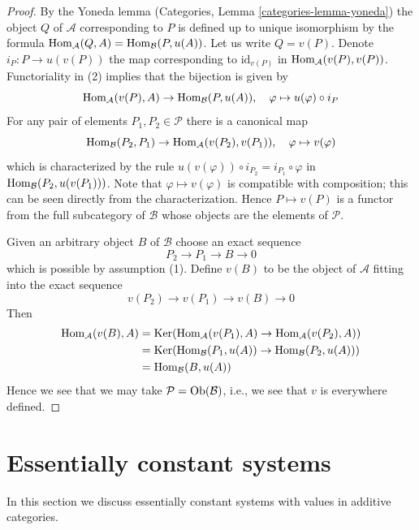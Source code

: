 \begin{proof}
By the Yoneda lemma (Categories, Lemma \ref{categories-lemma-yoneda})
the object $Q$ of $\mathcal{A}$ corresponding to $P$ is defined up to
unique isomorphism by the formula
$\mathop{\mathrm{Hom}}\nolimits_\mathcal{A}(Q, A) = \mathop{\mathrm{Hom}}\nolimits_\mathcal{B}(P, u(A))$. Let us write
$Q = v(P)$. Denote $i_P : P \to u(v(P))$ the map corresponding to
$\text{id}_{v(P)}$ in $\mathop{\mathrm{Hom}}\nolimits_\mathcal{A}(v(P), v(P))$. Functoriality
in (2) implies that the bijection is given by
$$
\mathop{\mathrm{Hom}}\nolimits_\mathcal{A}(v(P), A) \to \mathop{\mathrm{Hom}}\nolimits_\mathcal{B}(P, u(A)),\quad
\varphi \mapsto u(\varphi) \circ i_P
$$
For any pair of elements $P_1, P_2 \in \mathcal{P}$ there is a canonical map
$$
\mathop{\mathrm{Hom}}\nolimits_\mathcal{B}(P_2, P_1)
\to
\mathop{\mathrm{Hom}}\nolimits_\mathcal{A}(v(P_2), v(P_1)),\quad
\varphi \mapsto v(\varphi)
$$
which is characterized by the rule
$u(v(\varphi)) \circ i_{P_2} = i_{P_1} \circ \varphi$ in
$\mathop{\mathrm{Hom}}\nolimits_\mathcal{B}(P_2, u(v(P_1)))$.
Note that $\varphi \mapsto v(\varphi)$ is
compatible with composition; this can be seen directly
from the characterization. Hence $P \mapsto v(P)$ is a functor from
the full subcategory of $\mathcal{B}$ whose objects are the elements
of $\mathcal{P}$.

\medskip\noindent
Given an arbitrary object $B$ of $\mathcal{B}$ choose an exact sequence
$$
P_2 \to P_1 \to B \to 0
$$
which is possible by assumption (1). Define $v(B)$ to be the object of
$\mathcal{A}$ fitting into the exact sequence
$$
v(P_2) \to v(P_1) \to v(B) \to 0
$$
Then
\begin{align*}
\mathop{\mathrm{Hom}}\nolimits_\mathcal{A}(v(B), A)
& =
\mathop{\mathrm{Ker}}(\mathop{\mathrm{Hom}}\nolimits_\mathcal{A}(v(P_1), A) \to \mathop{\mathrm{Hom}}\nolimits_\mathcal{A}(v(P_2), A)) \\
& =
\mathop{\mathrm{Ker}}(\mathop{\mathrm{Hom}}\nolimits_\mathcal{B}(P_1, u(A)) \to \mathop{\mathrm{Hom}}\nolimits_\mathcal{B}(P_2, u(A))) \\
& =
\mathop{\mathrm{Hom}}\nolimits_\mathcal{B}(B, u(A))
\end{align*}
Hence we see that we may take $\mathcal{P} = \mathop{\mathrm{Ob}}\nolimits(\mathcal{B})$, i.e., we
see that $v$ is everywhere defined.
\end{proof}




\section{Essentially constant systems}
\label{section-essentially-constant}

\noindent
In this section we discuss essentially constant systems with values in
additive categories.

